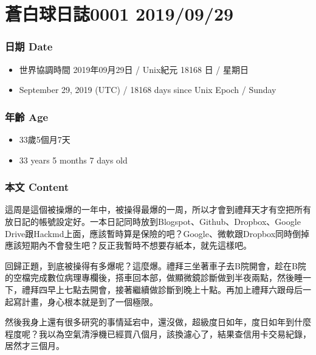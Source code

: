 \documentclass[
]{article}
\date{}
\providecommand{\tightlist}{%
  \setlength{\itemsep}{0pt}\setlength{\parskip}{0pt}}
\begin{document}
\hypertarget{ux84bcux767dux7403ux65e5ux8a8c0001-20190929}{%
\section{蒼白球日誌0001
2019/09/29}\label{ux84bcux767dux7403ux65e5ux8a8c0001-20190929}}

\hypertarget{ux65e5ux671f-date}{%
\subsubsection{日期 Date}\label{ux65e5ux671f-date}}

\begin{itemize}
\tightlist
\item
  世界協調時間 2019年09月29日 / Unix紀元 18168 日 / 星期日
\item
  September 29, 2019 (UTC) / 18168 days since Unix Epoch / Sunday
\end{itemize}

\hypertarget{ux5e74ux9f61-age}{%
\subsubsection{年齡 Age}\label{ux5e74ux9f61-age}}

\begin{itemize}
\tightlist
\item
  33歲5個月7天
\item
  33 years 5 months 7 days old
\end{itemize}

\hypertarget{ux672cux6587-content}{%
\subsubsection{本文 Content}\label{ux672cux6587-content}}

這周是這個被操爆的一年中，被操得最爆的一周，所以才會到禮拜天才有空把所有放日記的帳號設定好。一本日記同時放到Blogspot、Github、Dropbox、Google
Drive跟Hackmd上面，應該暫時算是保險的吧？Google、微軟跟Dropbox同時倒掉應該短期內不會發生吧？反正我暫時不想要存紙本，就先這樣吧。

回歸正題，到底被操得有多爆呢？這麼爆。禮拜三坐著車子去B院開會，趁在B院的空檔完成數位病理專欄後，搭車回本部，做顯微鏡診斷做到半夜兩點，然後睡一下，禮拜四早上七點去開會，接著繼續做診斷到晚上十點。再加上禮拜六跟母后一起寫計畫，身心根本就是到了一個極限。

然後我身上還有很多研究的事情延宕中，還沒做，超級度日如年，度日如年到什麼程度呢？我以為空氣清淨機已經買八個月，該換濾心了，結果查信用卡交易紀錄，居然才三個月。
\end{document}
